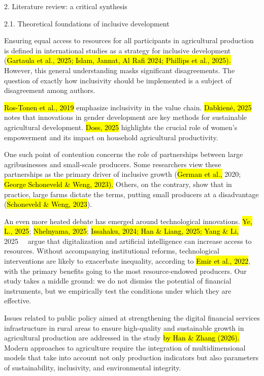 2. Literature review: a critical synthesis

2.1. Theoretical foundations of inclusive development

Ensuring equal access to resources for all participants in agricultural
production is defined in international studies as a strategy for
inclusive development (\hl{Gartaula et al., 2025; Islam, Jannat, Al Rafi
2024; Phillips et al., 2025).} However, this general understanding masks
significant disagreements. The question of exactly how inclusivity
should be implemented is a subject of disagreement among authors.

\hl{Ros-Tonen et al., 2019} emphasize inclusivity in the value chain.
\hl{Dabkienė, 2025} notes that innovations in gender development are key
methods for sustainable agricultural development. \hl{Doss, 2025}
highlights the crucial role of women's empowerment and its impact on
household agricultural productivity.

One such point of contention concerns the role of partnerships between
large agribusinesses and small-scale producers. Some researchers view
these partnerships as the primary driver of inclusive growth (\hl{German
et al.,} 2020; \hl{George Schoneveld \& Weng, 2023).} Others, on the
contrary, show that in practice, large farms dictate the terms, putting
small producers at a disadvantage (\hl{Schoneveld \& Weng, 2023}).

An even more heated debate has emerged around technological innovations.
\hl{Ye, L., 2025}; \hl{Nhelnyama, 2025}; \hl{Issahaku, 2024; Han \&
Liang, 2025; Yang \& Li,} 2025~~ argue that digitalization and
artificial intelligence can increase access to resources. Without
accompanying institutional reforms, technological interventions are
likely to exacerbate inequality, according to \hl{Emir et al., 2022},
with the primary benefits going to the most resource-endowed producers.
Our study takes a middle ground: we do not dismiss the potential of
financial instruments, but we empirically test the conditions under
which they are effective.

Issues related to public policy aimed at strengthening the digital
financial services infrastructure in rural areas to ensure high-quality
and sustainable growth in agricultural production are addressed in the
study \hl{by Han \& Zhang (2026).} Modern approaches to agriculture
require the integration of multidimensional models that take into
account not only production indicators but also parameters of
sustainability, inclusivity, and environmental integrity.

